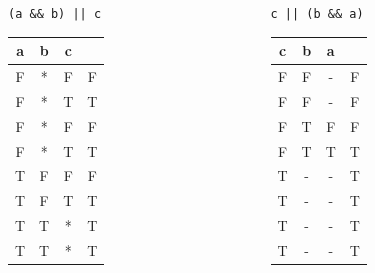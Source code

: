 \documentclass[xcolor = {dvipsnames, table}]{beamer}
\begin{document}
\begin{frame}
    \centering
    \begin{columns}
        \begin{column}{0.3\textwidth}
            \centering
            \lstinline{(a && b) || c}
            \begin{tabular}{c c c c}
                a & b & c & \\
                \hline
                F & * & F & F \\
                F & * & T & T \\
                F & * & F & F \\
                F & * & T & T \\

                T & F & F & F \\
                T & F & T & T \\
                T & T & * & T \\
                T & T & * & T \\
            \end{tabular}
        \end{column}

        \begin{column}{0.3\textwidth}
            \centering
            \lstinline{c || (b && a)}
            \begin{tabular}{c c c c}
                c & b & a & \\
                \hline
                F & F & - & F \\
                F & F & - & F \\
                F & T & F & F \\
                F & T & T & T \\

                T & - & - & T \\
                T & - & - & T \\
                T & - & - & T \\
                T & - & - & T \\
            \end{tabular}
        \end{column}
    \end{columns}
\end{frame}
\end{document}
